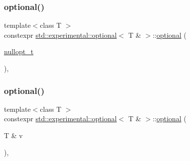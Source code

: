 \mbox{\label{classstd_1_1experimental_1_1optional_3_01_t_01_6_01_4_a745fea438842ecd75aaf55b508a072ac}} 
\subsubsection{\texorpdfstring{optional()}{optional()}\hspace{0.1cm}{\footnotesize\ttfamily [2/7]}}
{\footnotesize\ttfamily template$<$class T $>$ \\
constexpr \mbox{\hyperlink{classstd_1_1experimental_1_1optional}{std\+::experimental\+::optional}}$<$ T \& $>$\+::\mbox{\hyperlink{classstd_1_1experimental_1_1optional}{optional}} (\begin{DoxyParamCaption}\item[{\mbox{\hyperlink{structstd_1_1experimental_1_1nullopt__t}{nullopt\+\_\+t}}}]{ }\end{DoxyParamCaption})\hspace{0.3cm}{\ttfamily [inline]}, {\ttfamily [noexcept]}}

\mbox{\label{classstd_1_1experimental_1_1optional_3_01_t_01_6_01_4_a10614cd2647a523b5b8d6ec4fff1bbd5}} 
\subsubsection{\texorpdfstring{optional()}{optional()}\hspace{0.1cm}{\footnotesize\ttfamily [3/7]}}
{\footnotesize\ttfamily template$<$class T $>$ \\
constexpr \mbox{\hyperlink{classstd_1_1experimental_1_1optional}{std\+::experimental\+::optional}}$<$ T \& $>$\+::\mbox{\hyperlink{classstd_1_1experimental_1_1optional}{optional}} (\begin{DoxyParamCaption}\item[{T \&}]{v }\end{DoxyParamCaption})\hspace{0.3cm}{\ttfamily [inline]}, {\ttfamily [noexcept]}}

